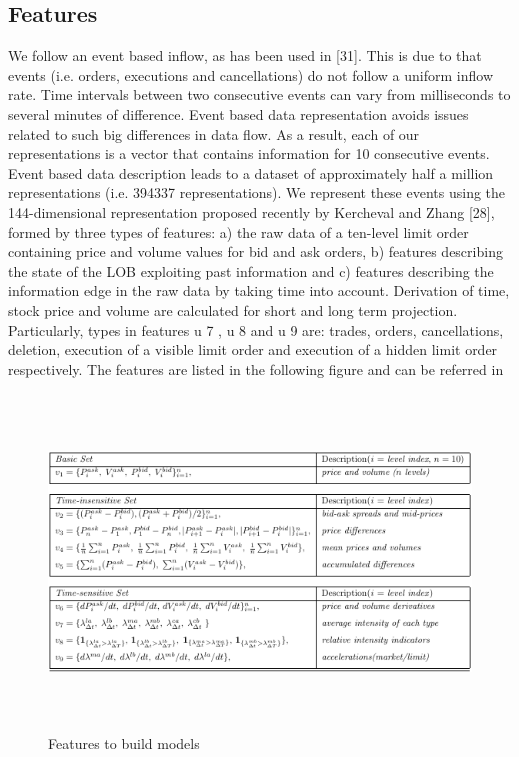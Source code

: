 \subsection{Features}
We follow an event based inflow, as has been used in [31]. This is due to
that events (i.e. orders, executions and cancellations) do not follow a uniform
inflow rate. Time intervals between two consecutive events can vary from
milliseconds to several minutes of difference. Event based data representation
avoids issues related to such big differences in data flow. As a result, each of
our representations is a vector that contains information for 10 consecutive
events. Event based data description leads to a dataset of approximately
half a million representations (i.e. 394337 representations). We represent
these events using the 144-dimensional representation proposed recently by
Kercheval and Zhang [28], formed by three types of features: a) the raw
data of a ten-level limit order containing price and volume values for bid
and ask orders, b) features describing the state of the LOB exploiting past
information and c) features describing the information edge in the raw data
by taking time into account. Derivation of time, stock price and volume are
calculated for short and long term projection. Particularly, types in features
u 7 , u 8 and u 9 are: trades, orders, cancellations, deletion, execution of a visible
limit order and execution of a hidden limit order respectively. The features are listed in the following figure and can be referred in \cite{kercheval2015modelling}  
\begin{figure}[hbtp]
  \begin{center}
    \includegraphics[width=4.5in,height=3.5in]{figures/features.png}
  \end{center}
\caption{Features to build models} \label{fig:feature}
\end{figure}


